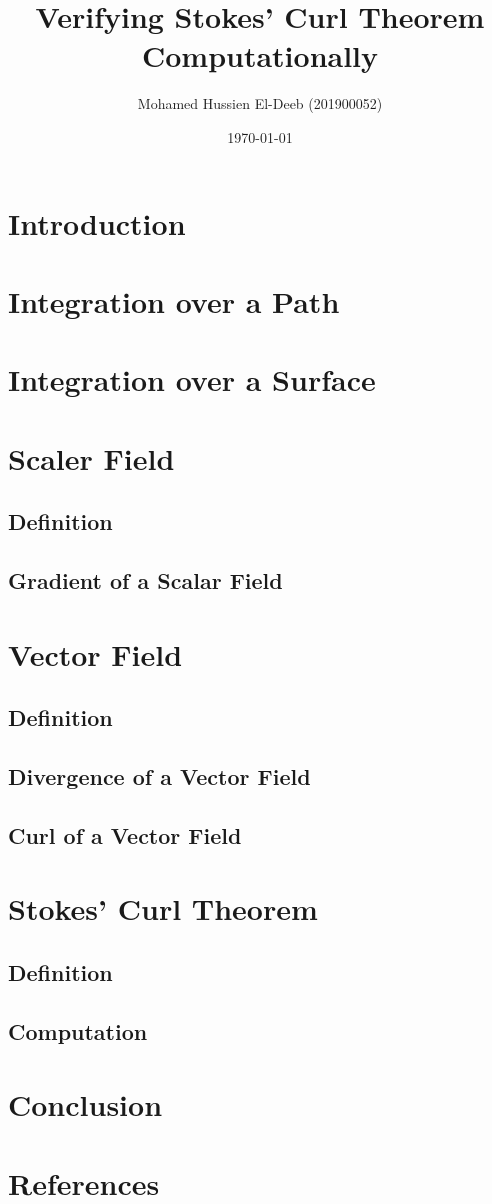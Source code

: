 \documentclass[12pt]{article}
\title{Verifying Stokes' Curl Theorem Computationally}
\author{Mohamed Hussien El-Deeb (201900052)}
\date{\today}
\begin{document}
\maketitle
\tableofcontents
\hypersetup{linkcolor=RoyalBlue4}

\newpage
\section{Introduction}
\section{Integration over a Path}
\section{Integration over a Surface}
\section{Scaler Field}
\subsection{Definition}
\subsection{Gradient of a Scalar Field}
\section{Vector Field}
\subsection{Definition}
\subsection{Divergence of a Vector Field}
\subsection{Curl of a Vector Field}
\section{Stokes' Curl Theorem}
\subsection{Definition}
\subsection{Computation}


\section{Conclusion}

\newpage
\section{References}


\nocite{El-Deeb_PEU-218_Assignments}
\end{document}
